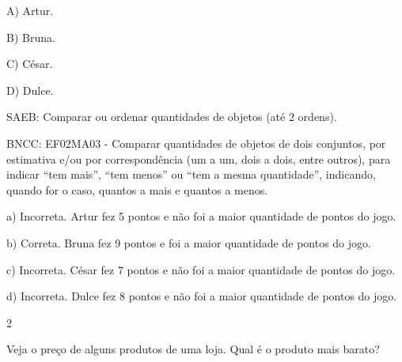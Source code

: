 \begin{escolha}
\begin{escolha}
{{{{A) Artur.

B) Bruna.

C) César.

D) Dulce.

SAEB: Comparar ou ordenar quantidades de objetos (até 2 ordens).

BNCC: EF02MA03 - Comparar quantidades de objetos de dois conjuntos, por
estimativa e/ou por correspondência (um a um, dois a dois, entre
outros), para indicar ``tem mais'', ``tem menos'' ou ``tem a mesma
quantidade'', indicando, quando for o caso, quantos a mais e quantos a
menos.

a) Incorreta. Artur fez 5 pontos e não foi a maior quantidade de pontos
do jogo.

b) Correta. Bruna fez 9 pontos e foi a maior quantidade de pontos do
jogo.

c) Incorreta. César fez 7 pontos e não foi a maior quantidade de pontos
do jogo.

d) Incorreta. Dulce fez 8 pontos e não foi a maior quantidade de pontos
do jogo.

\num{2}

Veja o preço de alguns produtos de uma loja. Qual é o produto mais
barato?

}}}}
\end{escolha}
\end{escolha}
